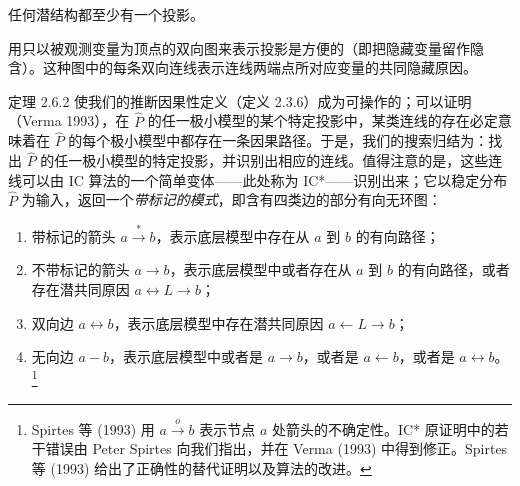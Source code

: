 \begin{theorem}[Verma 1993]
任何潜结构都至少有一个投影。
\end{theorem}

用只以被观测变量为顶点的双向图来表示投影是方便的（即把隐藏变量留作隐含）。这种图中的每条双向连线表示连线两端点所对应变量的共同隐藏原因。

定理 2.6.2 使我们的推断因果性定义（定义 2.3.6）成为可操作的；可以证明（Verma 1993），在 $\hat{P}$ 的任一极小模型的某个特定投影中，某类连线的存在必定意味着在 $\hat{P}$ 的每个极小模型中都存在一条因果路径。于是，我们的搜索归结为：找出 $\hat{P}$ 的任一极小模型的特定投影，并识别出相应的连线。值得注意的是，这些连线可以由 IC 算法的一个简单变体——此处称为 IC*——识别出来；它以稳定分布 $\hat{P}$ 为输入，返回一个\emph{带标记的模式}，即含有四类边的部分有向无环图：
\begin{enumerate}[label=\arabic*.,leftmargin=1.8em]
\item 带标记的箭头 $a\xrightarrow{*}b$，表示底层模型中存在从 $a$ 到 $b$ 的有向路径；
\item 不带标记的箭头 $a\to b$，表示底层模型中或者存在从 $a$ 到 $b$ 的有向路径，或者存在潜共同原因 $a\leftrightarrow L\to b$；
\item 双向边 $a\leftrightarrow b$，表示底层模型中存在潜共同原因 $a\leftarrow L\to b$；
\item 无向边 $a-b$，表示底层模型中或者是 $a\to b$，或者是 $a\leftarrow b$，或者是 $a\leftrightarrow b$。\footnote{Spirtes 等 (1993) 用 $a\overset{o}{\to}b$ 表示节点 $a$ 处箭头的不确定性。IC* 原证明中的若干错误由 Peter Spirtes 向我们指出，并在 Verma (1993) 中得到修正。Spirtes 等 (1993) 给出了正确性的替代证明以及算法的改进。}
\end{enumerate}

